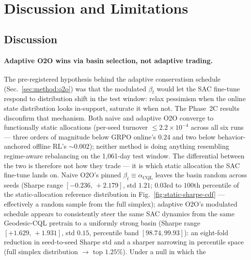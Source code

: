 
\section{Discussion and Limitations}
\label{sec:limitations}

\subsection{Discussion}
\label{sec:discussion}

\paragraph{Adaptive O2O wins via basin selection, not adaptive trading.}
The pre-registered hypothesis behind the adaptive conservatism schedule
(Sec.~\ref{sec:method:o2o}) was that the modulated $\beta_t$ would let
the SAC fine-tune respond to distribution shift in the test window:
relax pessimism when the online state distribution looks in-support,
saturate it when not. The Phase~2C results disconfirm that mechanism.
Both naive and adaptive O2O converge to functionally static allocations
(per-seed turnover $\le 2.2\!\times\!10^{-4}$ across all six runs ---
three orders of magnitude below GRPO online's $0.24$ and two below
behavior-anchored offline RL's $\sim 0.002$); neither method is doing
anything resembling regime-aware rebalancing on the 1{,}061-day test
window. The differential between the two is therefore not how they
trade --- it is which static allocation the SAC fine-tune lands on.
Naive O2O's pinned $\beta_t \equiv \alpha_{\mathrm{CQL}}$ leaves the
basin random across seeds (Sharpe range $[-0.236,\,+2.179]$, std $1.21$;
$0.03$rd to $100$th percentile of the static-allocation reference
distribution in Fig.~\ref{fig:static-sharpe-cdf} --- effectively a
random sample from the full simplex); adaptive O2O's modulated schedule
appears to consistently steer the same SAC dynamics from the same Geodesic-CQL
pretrain to a uniformly strong basin (Sharpe range
$[+1.629,\,+1.931]$, std $0.15$, percentile band
$[98.74, 99.93]$): an eight-fold reduction in seed-to-seed Sharpe std
and a sharper narrowing in percentile space (full simplex
distribution $\rightarrow$ top $1.25\%$). Under a null in which the
